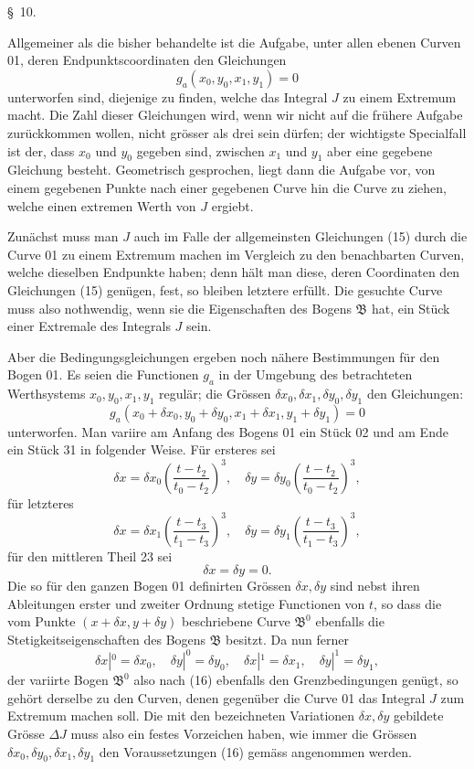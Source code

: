 \documentclass[11pt,a4paper,leqno]{article}
\begin{document}
\begin{center}{\large \S~10.}\end{center}

Allgemeiner als die bisher behandelte ist die Aufgabe, unter allen ebenen Curven 01, deren Endpunktscoordinaten den Gleichungen
\begin{equation}\tag{15}
g_a(x_0,y_0,x_1,y_1)=0
\end{equation}
unterworfen sind, diejenige zu finden, welche das Integral $J$ zu einem Extremum macht. Die Zahl dieser Gleichungen wird, wenn wir nicht auf die frühere Aufgabe zurückkommen wollen, nicht grösser als drei sein dürfen; der wichtigste Specialfall ist der, dass $x_0$ und $y_0$ gegeben sind, zwischen $x_1$ und $y_1$ aber eine gegebene Gleichung besteht. Geometrisch gesprochen, liegt dann die Aufgabe vor, von einem gegebenen Punkte nach einer gegebenen Curve hin die Curve zu ziehen, welche einen extremen Werth von $J$ ergiebt.

Zunächst muss man $J$ auch im Falle der allgemeinsten Gleichungen (15) durch die Curve 01 zu einem Extremum machen im Vergleich zu den benachbarten Curven, welche dieselben Endpunkte haben; denn hält man diese, deren Coordinaten den Gleichungen (15) genügen, fest, so bleiben letztere erfüllt. Die gesuchte Curve muss also nothwendig, wenn sie die Eigenschaften des Bogens $\mathfrak{B}$ hat, ein Stück einer Extremale des Integrals $J$ sein.

Aber die Bedingungsgleichungen ergeben noch nähere Bestimmungen für den Bogen 01. Es seien die Functionen $g_a$ in der Umgebung des betrachteten Werthsystems $x_0,y_0,x_1,y_1$ regulär; die Grössen $\delta x_0,\delta x_1,\delta y_0,\delta y_1$ den Gleichungen:
\begin{equation}\tag{16}
g_a(x_0+\delta x_0,y_0+\delta y_0,x_1+\delta x_1,y_1+\delta y_1)=0
\end{equation}
unterworfen. Man variire am Anfang des Bogens 01 ein Stück 02 und am Ende ein Stück 31 in folgender Weise. Für ersteres sei
\[
\delta x=\delta x_0\left(\frac{t-t_2}{t_0-t_2}\right)^3,
\quad
\delta y=\delta y_0\left(\frac{t-t_2}{t_0-t_2}\right)^3,
\]
für letzteres
\[
\delta x=\delta x_1\left(\frac{t-t_3}{t_1-t_3}\right)^3,
\quad
\delta y=\delta y_1\left(\frac{t-t_3}{t_1-t_3}\right)^3,
\]
für den mittleren Theil 23 sei
\[
\delta x=\delta y=0.
\]
Die so für den ganzen Bogen 01 definirten Grössen $\delta x,\delta y$ sind nebst ihren Ableitungen erster und zweiter Ordnung stetige Functionen von $t$, so dass die vom Punkte $(x+\delta x,y+\delta y)$ beschriebene Curve $\mathfrak{B}^0$ ebenfalls die Stetigkeitseigenschaften des Bogens $\mathfrak{B}$ besitzt. Da nun ferner
\[
\delta x|^0=\delta x_0,\quad \delta y|^0=\delta y_0,\quad
\delta x|^1=\delta x_1,\quad \delta y|^1=\delta y_1,
\]
der variirte Bogen $\mathfrak{B}^0$ also nach (16) ebenfalls den Grenzbedingungen genügt, so gehört derselbe zu den Curven, denen gegenüber die Curve 01 das Integral $J$ zum Extremum machen soll. Die mit den bezeichneten Variationen $\delta x,\delta y$ gebildete Grösse $\Delta J$ muss also ein festes Vorzeichen haben, wie immer die Grössen $\delta x_0,\delta y_0,\delta x_1,\delta y_1$ den Voraussetzungen (16) gemäss angenommen werden.
\end{document}

